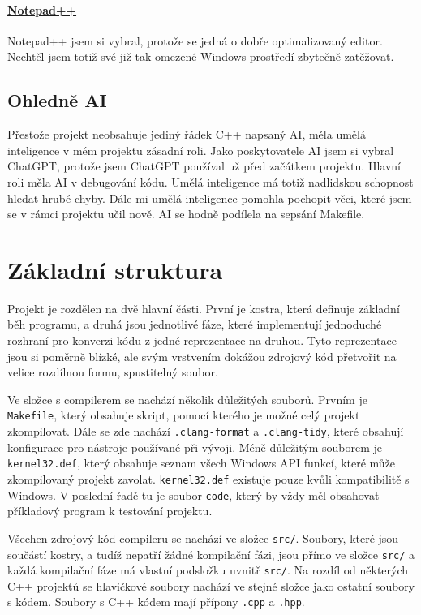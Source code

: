 \documentclass[12pt, a4paper, titlepage, abstract=on]{scrreprt}
\begin{document}
\paragraph{\href{https://notepad-plus-plus.org/}{Notepad++}}
Notepad++ jsem si vybral, protože se jedná o dobře optimalizovaný editor. Nechtěl jsem totiž své již tak omezené Windows prostředí zbytečně zatěžovat.
\subsection{Ohledně AI}
Přestože projekt neobsahuje jediný řádek C++ napsaný AI, měla umělá inteligence v mém projektu zásadní roli. Jako poskytovatele AI jsem si vybral ChatGPT,
protože jsem ChatGPT používal už před začátkem projektu. Hlavní roli měla AI v debugování kódu. Umělá inteligence má totiž nadlidskou schopnost
hledat hrubé chyby. Dále mi umělá inteligence pomohla pochopit věci, které jsem se v rámci projektu učil nově. AI se hodně podílela na sepsání Makefile.
\section{Základní struktura}
Projekt je rozdělen na dvě hlavní části. První je kostra, která definuje základní běh programu, a druhá jsou jednotlivé fáze, které implementují
jednoduché rozhraní pro konverzi kódu z jedné reprezentace na druhou. Tyto reprezentace jsou si poměrně blízké, ale svým vrstvením dokážou
zdrojový kód přetvořit na velice rozdílnou formu, spustitelný soubor.

Ve složce s compilerem se nachází několik důležitých souborů. Prvním je \texttt{Makefile}, který obsahuje skript, pomocí kterého je možné
celý projekt zkompilovat. Dále se zde nachází \texttt{.clang-format} a \texttt{.clang-tidy}, které obsahují konfigurace pro nástroje
používané při vývoji. Méně důležitým souborem je \texttt{kernel32.def}, který obsahuje seznam všech Windows API funkcí, které může zkompilovaný
projekt zavolat. \texttt{kernel32.def} existuje pouze kvůli kompatibilitě s Windows. V poslední řadě tu je soubor \texttt{code}, který by
vždy měl obsahovat příkladový program k testování projektu.

Všechen zdrojový kód compileru se nachází ve složce \texttt{src/}. Soubory, které jsou součástí kostry, a tudíž nepatří žádné kompilační
fázi, jsou přímo ve složce \texttt{src/} a každá kompilační fáze má vlastní podsložku uvnitř \texttt{src/}. Na rozdíl od některých C++
projektů se hlavičkové soubory nachází ve stejné složce jako ostatní soubory s kódem. Soubory s C++ kódem mají přípony \texttt{.cpp} a
\texttt{.hpp}.
\end{document}
